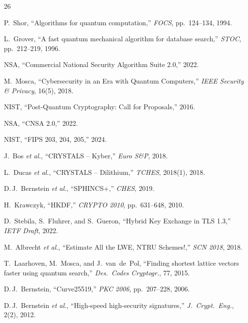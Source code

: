 \documentclass[11pt,a4paper]{article}
\begin{document}

\begin{thebibliography}{26}

P.~Shor,
``Algorithms for quantum computation,''
\emph{FOCS}, pp.~124--134, 1994.

L.~Grover,
``A fast quantum mechanical algorithm for database search,''
\emph{STOC}, pp.~212--219, 1996.

NSA,
``Commercial National Security Algorithm Suite 2.0,''
2022.

M.~Mosca,
``Cybersecurity in an Era with Quantum Computers,''
\emph{IEEE Security \& Privacy}, 16(5), 2018.

NIST,
``Post-Quantum Cryptography: Call for Proposals,''
2016.

NSA,
``CNSA 2.0,''
2022.

NIST,
``FIPS 203, 204, 205,''
2024.

J.~Bos \emph{et al.},
``CRYSTALS -- Kyber,''
\emph{Euro S\&P}, 2018.

L.~Ducas \emph{et al.},
``CRYSTALS -- Dilithium,''
\emph{TCHES}, 2018(1), 2018.

D.\,J.~Bernstein \emph{et al.},
``SPHINCS+,''
\emph{CHES}, 2019.

H.~Krawczyk,
``HKDF,''
\emph{CRYPTO 2010}, pp.~631--648, 2010.

D.~Stebila, S.~Fluhrer, and S.~Gueron,
``Hybrid Key Exchange in TLS 1.3,''
\emph{IETF Draft}, 2022.

M.~Albrecht \emph{et al.},
``Estimate All the LWE, NTRU Schemes!,''
\emph{SCN 2018}, 2018.

T.~Laarhoven, M.~Mosca, and J.~van~de~Pol,
``Finding shortest lattice vectors faster using quantum search,''
\emph{Des.\ Codes Cryptogr.}, 77, 2015.

D.\,J.~Bernstein,
``Curve25519,''
\emph{PKC 2006}, pp.~207--228, 2006.

D.\,J.~Bernstein \emph{et al.},
``High-speed high-security signatures,''
\emph{J.\ Crypt.\ Eng.}, 2(2), 2012.


\end{thebibliography}
\end{document}
